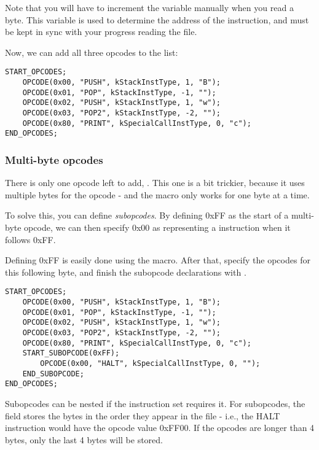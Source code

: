 Note that you will have to increment the  variable manually when you read a byte. This variable is used to determine the address of the instruction, and must be kept in sync with your progress reading the file.

Now, we can add all three opcodes to the list:

\begin{C++}
\begin{lstlisting}
START_OPCODES;
	OPCODE(0x00, "PUSH", kStackInstType, 1, "B");
	OPCODE(0x01, "POP", kStackInstType, -1, "");
	OPCODE(0x02, "PUSH", kStackInstType, 1, "w");
	OPCODE(0x03, "POP2", kStackInstType, -2, "");
	OPCODE(0x80, "PRINT", kSpecialCallInstType, 0, "c");
END_OPCODES;
\end{lstlisting}
\end{C++}

\subsubsection{Multi-byte opcodes}
There is only one opcode left to add, . This one is a bit trickier, because it uses multiple bytes for the opcode - and the  macro only works for one byte at a time.

To solve this, you can define \emph{subopcodes}. By defining 0xFF as the start of a multi-byte opcode, we can then specify 0x00 as representing a  instruction when it follows 0xFF.

Defining 0xFF is easily done using the  macro. After that, specify the opcodes for this following byte, and finish the subopcode declarations with .

\begin{C++}
\begin{lstlisting}
START_OPCODES;
	OPCODE(0x00, "PUSH", kStackInstType, 1, "B");
	OPCODE(0x01, "POP", kStackInstType, -1, "");
	OPCODE(0x02, "PUSH", kStackInstType, 1, "w");
	OPCODE(0x03, "POP2", kStackInstType, -2, "");
	OPCODE(0x80, "PRINT", kSpecialCallInstType, 0, "c");
	START_SUBOPCODE(0xFF);
		OPCODE(0x00, "HALT", kSpecialCallInstType, 0, "");
	END_SUBOPCODE;
END_OPCODES;
\end{lstlisting}
\end{C++}

Subopcodes can be nested if the instruction set requires it. For subopcodes, the  field stores the bytes in the order they appear in the file - i.e., the HALT instruction would have the opcode value 0xFF00. If the opcodes are longer than 4 bytes, only the last 4 bytes will be stored.

